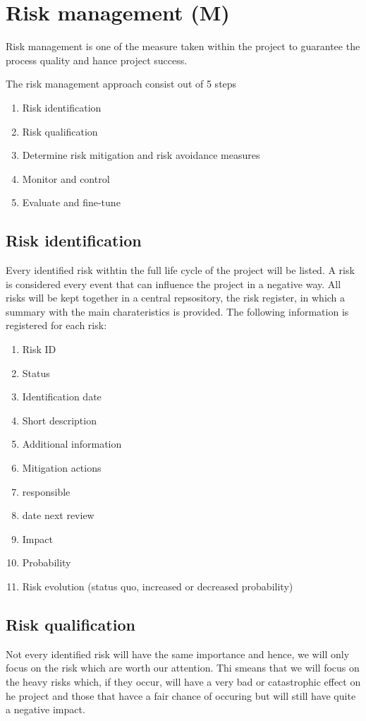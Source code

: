 \section{Risk management (M)}
\label{sec:risk-management}
Risk management is one of the measure taken within the project to guarantee the process quality and hance project success.

The risk management approach consist out of 5 steps

\begin{enumerate}
	\item Risk identification 
	\item Risk qualification
	\item Determine risk mitigation and risk avoidance measures
	\item Monitor and control
	\item Evaluate and fine-tune
\end {enumerate}
\subsection{Risk identification }
Every identified risk withtin the full life cycle of the project will be listed. A risk is considered every event that can influence the project in a negative way. 
All risks will be kept together in a central repsository, the risk register, in which a summary with the main charateristics is provided.
The following information is registered for each risk:

\begin{enumerate}
	\item Risk ID
	\item Status
	\item Identification date
	\item Short description
	\item Additional information
	\item Mitigation actions
	\item responsible
	\item date next review
	\item Impact
	\item Probability
	\item Risk evolution (status quo, increased or decreased probability)
\end {enumerate}

\subsection{Risk qualification }
Not every identified risk will have the same importance and hence, we will only focus on the risk which are worth our attention.
Thi smeans that we will focus on the heavy risks which, if they occur, will have a very bad or catastrophic effect on he project and those that havce a fair chance of occuring but will still have quite a negative impact.

